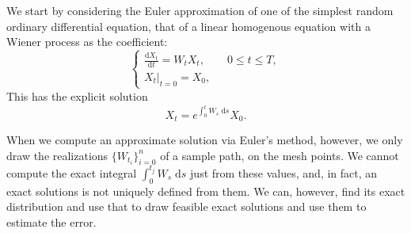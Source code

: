 \documentclass[reqno,12pt]{amsart}
\theoremstyle{plain}%
\theoremstyle{definition}
\begin{document}
We start by considering the Euler approximation of one of the simplest random ordinary differential equation, that of a linear homogenous equation with a Wiener process as the coefficient:
\begin{equation}
    \label{linearhomogeneousrode}
    \begin{cases}
        \displaystyle \frac{\mathrm{d}X_t}{\mathrm{d} t} = W_t X_t, \qquad 0 \leq t \leq T, \\
        \left. X_t \right|_{t = 0} = X_0,
      \end{cases}
\end{equation}
This has the explicit solution
\begin{equation}
    X_t = e^{\int_0^t W_s \;\mathrm{d}s}X_0.
\end{equation}

When we compute an approximate solution via Euler's method, however, we only draw the realizations $\{W_{t_i}\}_{i=0}^n$ of a sample path, on the mesh points. We cannot compute the exact integral $\int_0^{t_j} W_s\;\mathrm{d}s$ just from these values, and, in fact, an exact solutions is not uniquely defined from them. We can, however, find its exact distribution and use that to draw feasible exact solutions and use them to estimate the error.
\end{document}
